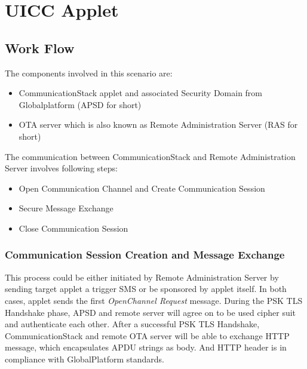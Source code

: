 \section{UICC Applet}
\subsection {Work Flow}

The components involved in this scenario are:
 \begin{itemize}
  \item CommunicationStack applet and associated Security Domain from Globalplatform (APSD  for short)
  \item OTA server which is also known as Remote Administration Server (RAS for short)
\end{itemize}

The communication between CommunicationStack and Remote Administration Server involves following  steps:

 \begin{itemize}
  \item Open Communication Channel and Create Communication Session
  \item Secure Message Exchange
  \item Close Communication Session
\end{itemize}
\subsubsection{Communication Session Creation and Message Exchange}
This process could be either initiated by Remote Administration Server by sending target applet a trigger SMS or be sponsored by applet itself. In both cases, applet sends the first \emph{OpenChannel Request} message. During the PSK TLS Handshake phase, APSD and remote server will agree on to be used cipher suit and authenticate each other. After a successful PSK TLS Handshake, CommunicationStack and remote OTA server will be able to exchange HTTP message, which encapsulates APDU strings as body. And HTTP header is in compliance with GlobalPlatform standards.


